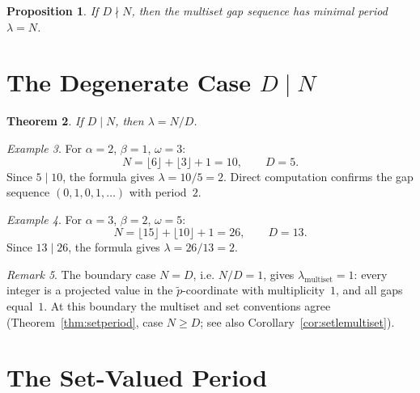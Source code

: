 \documentclass[11pt,reqno]{amsart}
\theoremstyle{plain}
\newtheorem{theorem}{Theorem}[section]
\newtheorem{proposition}[theorem]{Proposition}
\theoremstyle{definition}
\theoremstyle{remark}
\newtheorem{remark}[theorem]{Remark}
\newtheorem{example}[theorem]{Example}
\begin{document}
\begin{proposition}\label{prop:generic_period}
If \(D \nmid N\), then the multiset gap sequence has minimal
period \(\lambda = N\).
\end{proposition}

\section{\texorpdfstring{The Degenerate Case \(D \mid N\)}{The Degenerate Case D divides N}}\label{sec:degenerate}

\begin{theorem}\label{thm:degenerate}
If \(D \mid N\), then \(\lambda = N/D\).
\end{theorem}

\begin{example}\label{ex:degenerate}
For \(\alpha = 2\), \(\beta = 1\), \(\omega = 3\):
\[
    N = \lfloor 6 \rfloor + \lfloor 3 \rfloor + 1 = 10,
    \qquad
    D = 5.
\]
Since \(5 \mid 10\), the formula gives \(\lambda = 10/5 = 2\).
Direct computation confirms the gap sequence
\((0, 1, 0, 1, \ldots)\) with period~\(2\).
\end{example}

\begin{example}\label{ex:degenerate2}
For \(\alpha = 3\), \(\beta = 2\), \(\omega = 5\):
\[
    N = \lfloor 15 \rfloor + \lfloor 10 \rfloor + 1 = 26,
    \qquad
    D = 13.
\]
Since \(13 \mid 26\), the formula gives \(\lambda = 26/13 = 2\).
\end{example}

\begin{remark}\label{rem:boundary}
The boundary case \(N = D\), i.e. \(N/D = 1\), gives
\(\lambda_{\mathrm{multiset}} = 1\): every integer is a projected value in
the \(\tilde{p}\)-coordinate with multiplicity~\(1\), and all gaps
equal~\(1\).  At this boundary the multiset and set conventions agree
(Theorem~\ref{thm:setperiod}, case \(N \ge D\); see also
Corollary~\ref{cor:setlemultiset}).
\end{remark}

\section{The Set-Valued Period}\label{sec:setvalued}
\end{document}
